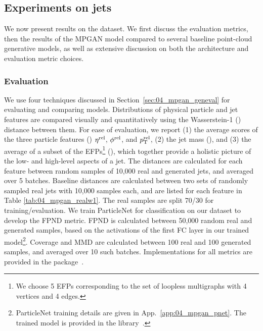 \subsection{Experiments on jets}
\label{sec:04_mpgan_exp}

We now present results on the \jetnet dataset.
We first discuss the evaluation metrics, then the results of the MPGAN model compared to several baseline point-cloud generative models, as well as extensive discussion on both the architecture and evaluation metric choices.

\subsubsection{Evaluation}
\label{sec:04_mpgan_eval}

We use four techniques discussed in Section~\ref{sec:04_mpgan_geneval} for evaluating and comparing models. 
Distributions of physical particle and jet features are compared visually and quantitatively using the Wasserstein-1 (\wass) distance between them. 
For ease of evaluation, we report (1) the average scores of the three particle features (\wassp) $\eta^\mathrm{rel}$, $\phi^\mathrm{rel}$, and $p_\mathrm{T}^\mathrm{rel}$, (2) the jet mass (\wassm), and (3) the average of a subset of the EFPs\footnote{We choose 5 EFPs corresponding to the set of loopless multigraphs with 4 vertices and 4 edges.}
(\wassefp), which together provide a holistic picture of the low- and high-level aspects of a jet. 
The \wass distances are calculated for each feature between random samples of 10,000 real and generated jets, and averaged over 5 batches. 
Baseline \wass distances are calculated between two sets of randomly sampled real jets with 10,000 samples each, and are listed for each feature in Table \ref{tab:04_mpgan_realw1}.
The real samples are split 70/30 for training/evaluation.
We train ParticleNet for classification on our dataset to develop the FPND metric.
FPND is calculated between 50,000 random real and generated samples, based on the activations of the first FC layer in our trained model\footnote{ParticleNet training details are given in App.~\ref{app:04_mpgan_pnet}. The trained model is provided in the \jetnet library~\cite{jetnetlib}.}. 
Coverage and MMD are calculated between 100 real and 100 generated samples, and averaged over 10 such batches.
Implementations for all metrics are provided in the \jetnet package~\cite{jetnetlib}.


